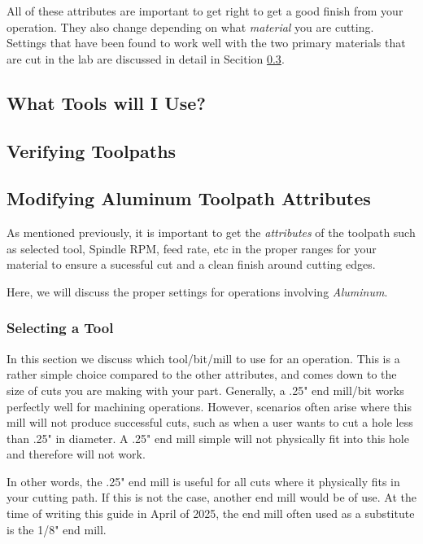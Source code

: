 \documentclass{article}
\begin{document}
All of these attributes are important to get right to get a good finish from your operation. They also change depending on what \textit{material} you 
are cutting. Settings that have been found to work well with the two primary materials that are cut in the lab are discussed in detail in 
Secition \ref{sec:modifying-toolpath-attr}.

\subsection{What Tools will I Use?}

\subsection{Verifying Toolpaths}
\label{sec:verifying-toolpath}

\subsection{Modifying Aluminum Toolpath Attributes}
\label{sec:modifying-toolpath-attr}

As mentioned previously, it is important to get the \textit{attributes} of the toolpath such as selected tool, Spindle RPM, feed rate, etc in the 
proper ranges for your material to ensure a sucessful cut and a clean finish around cutting edges. 

Here, we will discuss the proper settings for operations involving \textit{Aluminum}.

\subsubsection{Selecting a Tool}
In this section we discuss which tool/bit/mill to use for an operation. This is a rather simple choice compared to the other attributes, and comes down
to the size of cuts you are making with your part. Generally, a .25" end mill/bit works perfectly well for machining operations. However, scenarios 
often arise where this mill will not produce successful cuts, such as when a user wants to cut a hole less than .25" in diameter. A .25" end mill simple 
will not physically fit into this hole and therefore will not work.

In other words, the .25" end mill is useful for all cuts where it physically fits in your cutting path. If this is not the case, another end mill would 
be of use. At the time of writing this guide in April of 2025, the end mill often used as a substitute is the 1/8" end mill. 
\end{document}
